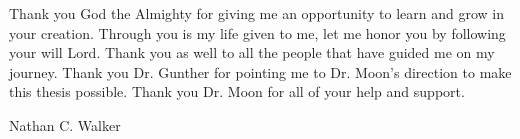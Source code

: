 %
%
%
%
%

\begin{acknowledgments} 
Thank you God the Almighty for giving me an opportunity to learn and grow in your creation. Through you is my life given to me, let me honor you by following your will Lord. Thank you as well to all the people that have guided me on my journey. Thank you Dr. Gunther for pointing me to Dr. Moon's direction to make this thesis possible. Thank you Dr. Moon for all of your help and support.

\begin{flushright} 
Nathan C. Walker
\end{flushright}
\end{acknowledgments}

